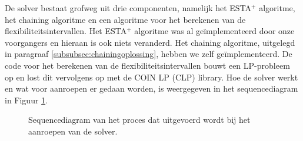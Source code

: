 De solver bestaat grofweg uit drie componenten, namelijk het ESTA$^+$ algoritme, het chaining algoritme en een algoritme voor het berekenen van de flexibiliteitsintervallen. Het ESTA$^+$ algoritme was al ge\"implementeerd door onze voorgangers en hieraan is ook niets veranderd. Het chaining algoritme, uitgelegd in paragraaf \ref{subsubsec:chainingoplossing}, hebben we zelf ge\"implementeerd. De code voor het berekenen van de flexibiliteitsintervallen bouwt een LP-probleem op en lost dit vervolgens op met de COIN LP (CLP) library. Hoe de solver werkt en wat voor aanroepen er gedaan worden, is weergegeven in het sequencediagram in Figuur \ref{fig:sd}.

\newpage
\begin{figure}[H]
\centering

\caption{Sequencediagram van het proces dat uitgevoerd wordt bij het aanroepen van de solver.} 
\label{fig:sd}
\end{figure}

\newpage
